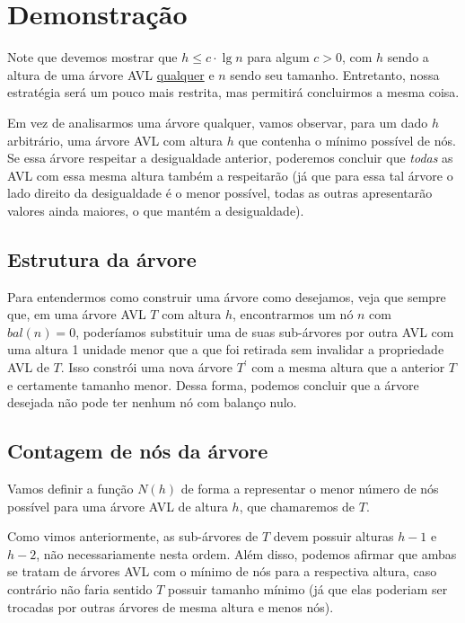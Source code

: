 \documentclass[10pt,a4paper,twoside]{article}
\theoremstyle{definition}
\begin{document}
\section{Demonstração}

Note que devemos mostrar que \( h \leq c \cdot \lg n \) para algum \( c > 0 \), com \( h \) sendo a altura de uma árvore AVL \ul{qualquer} e \( n \) sendo seu tamanho. Entretanto, nossa estratégia será um pouco mais restrita, mas permitirá concluirmos a mesma coisa.

Em vez de analisarmos uma árvore qualquer, vamos observar, para um dado \( h \) arbitrário, uma árvore AVL com altura \( h \) que contenha o mínimo possível de nós. Se essa árvore respeitar a desigualdade anterior, poderemos concluir que \emph{todas} as AVL com essa mesma altura também a respeitarão (já que para essa tal árvore o lado direito da desigualdade é o menor possível, todas as outras apresentarão valores ainda maiores, o que mantém a desigualdade).

\subsection{Estrutura da árvore}
Para entendermos como construir uma árvore como desejamos, veja que sempre que, em uma árvore AVL \( T \) com altura \( h \), encontrarmos um nó \( n \) com \( bal(n) = 0 \), poderíamos substituir uma de suas sub-árvores por outra AVL com uma altura 1 unidade menor que a que foi retirada sem invalidar a propriedade AVL de \( T \). Isso constrói uma nova árvore \( T^\prime \) com a mesma altura que a anterior \( T \) e certamente tamanho menor. Dessa forma, podemos concluir que a árvore desejada não pode ter nenhum nó com balanço nulo.

\subsection{Contagem de nós da árvore}
Vamos definir a função \( N(h) \) de forma a representar o menor número de nós possível para uma árvore AVL de altura \( h \), que chamaremos de \( T \).

Como vimos anteriormente, as sub-árvores de \( T \) devem possuir alturas \( h-1 \) e \( h-2 \), não necessariamente nesta ordem. Além disso, podemos afirmar que ambas se tratam de árvores AVL com o mínimo de nós para a respectiva altura, caso contrário não faria sentido \( T \) possuir tamanho mínimo (já que elas poderiam ser trocadas por outras árvores de mesma altura e menos nós).
\end{document}
